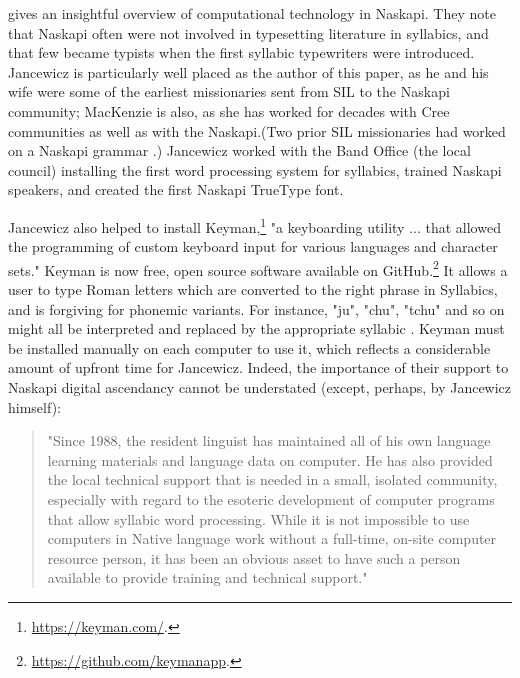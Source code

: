 \citet{jancewicz2002applied} gives an insightful overview of computational technology in Naskapi. They note that Naskapi often were not involved in typesetting literature in syllabics, and that few became typists when the first syllabic typewriters were introduced. Jancewicz is particularly well placed as the author of this paper, as he and his wife were some of the earliest missionaries sent from SIL to the Naskapi community; MacKenzie is also, as she has worked for decades with Cree communities as well as with the Naskapi.(Two prior SIL missionaries had worked on a Naskapi grammar \citep{martens1983practical}.) Jancewicz worked with the Band Office (the local council) installing the first word processing system for syllabics, trained Naskapi speakers, and created the first Naskapi TrueType font.

Jancewicz also helped to install Keyman,\footnote{\href{https://keyman.com/}{https://keyman.com/}. } "a keyboarding utility ... that allowed the programming of custom keyboard input for various languages and character sets." \citep[85]{jancewicz2002applied} Keyman is now free, open source software available on GitHub.\footnote{\href{https://github.com/keymanapp}{https://github.com/keymanapp}. } It allows a user to type Roman letters which are converted to the right phrase in Syllabics, and is forgiving for phonemic variants. For instance, "ju", "chu", "tchu" and so on might all be interpreted and replaced by the appropriate syllabic . %
Keyman must be installed manually on each computer to use it, which reflects a considerable amount of upfront time for Jancewicz. Indeed, the importance of their support to Naskapi digital ascendancy cannot be understated (except, perhaps, by Jancewicz himself):

\begin{quote}
"Since 1988, the resident linguist has maintained all of his own language learning materials and language data on computer. He has also provided the local technical support that is needed in a small, isolated community, especially with regard to the esoteric development of computer programs that allow syllabic word processing. While it is not impossible to use computers in Native language work without a full-time, on-site computer resource person, it has been an obvious asset to have such a person available to provide training and technical support." \citep[86]{jancewicz2002applied}
\end{quote}

